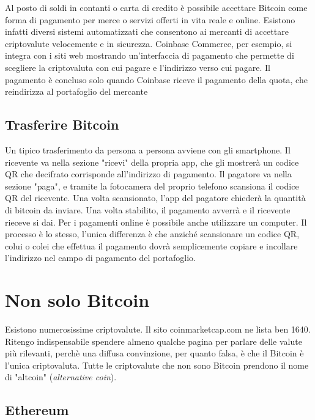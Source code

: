 \documentclass {article}
\begin{document}
Al posto di soldi in contanti o carta di credito è possibile accettare Bitcoin come forma di pagamento per merce o servizi offerti in vita reale e online.
Esistono infatti diversi sistemi automatizzati che consentono ai mercanti di accettare criptovalute velocemente e in sicurezza.
Coinbase Commerce, per esempio, si integra con i siti web mostrando un'interfaccia di pagamento che permette di scegliere la criptovaluta con cui pagare e l'indirizzo verso cui pagare. Il pagamento è concluso solo quando Coinbase riceve il pagamento della quota, che reindirizza al portafoglio del mercante


\subsection {Trasferire Bitcoin}


Un tipico trasferimento da persona a persona avviene con gli smartphone.
Il ricevente va nella sezione "ricevi" della propria app, che gli mostrerà un codice QR che decifrato corrisponde all'indirizzo di pagamento.
Il pagatore va nella sezione "paga", e tramite la fotocamera del proprio telefono scansiona il codice QR del ricevente.
Una volta scansionato, l'app del pagatore chiederà la quantità di bitcoin da inviare. Una volta stabilito, il pagamento avverrà e il ricevente rieceve si dai.
Per i pagamenti online è possibile anche utilizzare un computer. Il processo è lo stesso, l'unica differenza è che anziché scansionare un codice QR, colui o colei che effettua il pagamento dovrà semplicemente copiare e incollare l'indirizzo nel campo di pagamento del portafoglio.


\newpage


\section {Non solo Bitcoin}


Esistono numerosissime criptovalute. Il sito coinmarketcap.com ne lista ben 1640. Ritengo indispensabile spendere almeno qualche pagina per parlare delle valute più rilevanti, perchè una diffusa convinzione, per quanto falsa, è che il Bitcoin è l'unica criptovaluta. Tutte le criptovalute che non sono Bitcoin prendono il nome di "altcoin" (\textit{alternative coin}).


\subsection {Ethereum}
\end{document}
